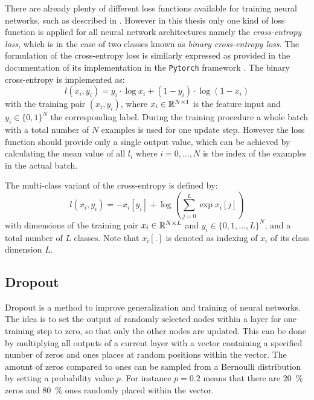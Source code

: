 There are already plenty of different loss functions available for training neural networks, such as described in \cite{LeCun2006}. 
However in this thesis only one kind of loss function is applied for all neural network architectures namely the \emph{cross-entropy loss}, which is in the case of two classes known as \emph{binary cross-entropy loss}.
The formulation of the cross-entropy loss is similarly expressed as provided in the documentation of its implementation in the \texttt{Pytorch} framework \cite{Pytorch}.
The binary cross-entropy is implemented as:
\begin{equation}\label{eq:nn_theory_binary_cross_entropy}
  l(x_i, y_i) = y_i \cdot \log x_i + (1 - y_i) \cdot \log (1 - x_i)
\end{equation}
with the training pair $(x_i, y_i)$, where $x_i \in \mathbb{R}^{N \times 1}$ is the feature input and $y_i \in \{0, 1\}^N$ the corresponding label.
During the training procedure a whole batch with a total number of $N$ examples is used for one update step.
However the loss function should provide only a single output value, which can be achieved by calculating the mean value of all $l_i$ where $i = 0, \dots, N$ is the index of the examples in the actual batch.

The multi-class variant of the cross-entropy is defined by:
\begin{equation}
  l(x_i, y_i) = - x_i[y_i] + \log{\left( \sum_{j=0}^{L} \exp{x_i[j]} \right)}
\end{equation}
with dimensions of the training pair $x_i \in \mathbb{R}^{N \times L}$ and $y_i \in \{0, 1, \dots, L\}^N$, and a total number of $L$ classes.
Note that $x_i[.]$ is denoted as indexing of $x_i$ of its class dimension $L$. 



\subsection{Dropout}
Dropout \cite{Hinton2012} is a method to improve generalization and training of neural networks.
The idea is to set the output of randomly selected nodes within a layer for one training step to zero, so that only the other nodes are updated.
This can be done by multiplying all outputs of a current layer with a vector containing a specified number of zeros and ones places at random positions within the vector.
The amount of zeros compared to ones can be sampled from a Bernoulli distribution by setting a probability value $p$.
For instance $p=0.2$ means that there are \SI{20}{\percent} zeros and \SI{80}{\percent} ones randomly placed within the vector.


